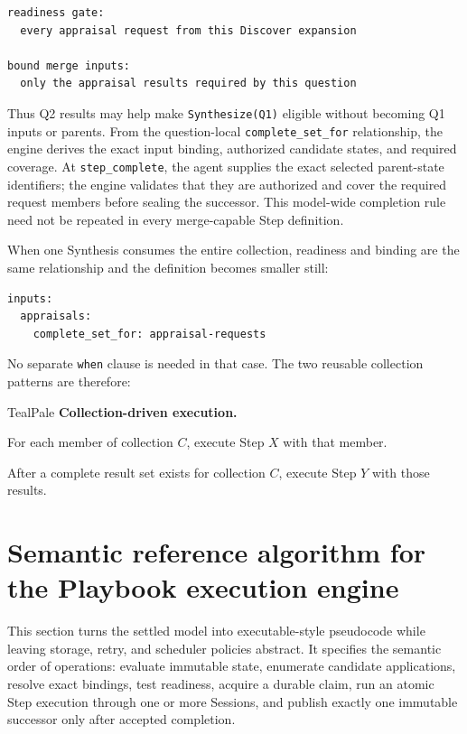 \documentclass[11pt]{article}
\begin{document}
\begin{lstlisting}[style=playbook,basicstyle=\ttfamily\scriptsize]
readiness gate:
  every appraisal request from this Discover expansion

bound merge inputs:
  only the appraisal results required by this question
\end{lstlisting}

Thus Q2 results may help make \texttt{Synthesize(Q1)} eligible without becoming
Q1 inputs or parents. From the question-local \texttt{complete\_set\_for}
relationship, the engine derives the exact input binding, authorized candidate
states, and required coverage. At \texttt{step\_complete}, the agent supplies
the exact selected parent-state identifiers; the engine validates that they
are authorized and cover the required request members before sealing the
successor. This model-wide completion rule need not be repeated in every
merge-capable Step definition.

When one Synthesis consumes the entire collection, readiness and binding are
the same relationship and the definition becomes smaller still:

\begin{lstlisting}[style=playbook,basicstyle=\ttfamily\scriptsize]
inputs:
  appraisals:
    complete_set_for: appraisal-requests
\end{lstlisting}

No separate \texttt{when} clause is needed in that case. The two reusable
collection patterns are therefore:

\begin{decisionbox}{TealPale}
\textbf{Collection-driven execution.}

\smallskip
\noindent For each member of collection \(C\), execute Step \(X\) with that
member.

\smallskip
\noindent After a complete result set exists for collection \(C\), execute Step
\(Y\) with those results.
\end{decisionbox}

\clearpage
\section{Semantic reference algorithm for the Playbook execution engine}

This section turns the settled model into executable-style pseudocode while
leaving storage, retry, and scheduler policies abstract. It specifies the
semantic order of operations: evaluate immutable state, enumerate candidate
applications, resolve exact bindings, test readiness, acquire a durable claim,
run an atomic Step execution through one or more Sessions, and publish exactly
one immutable successor only after accepted completion.
\end{document}
